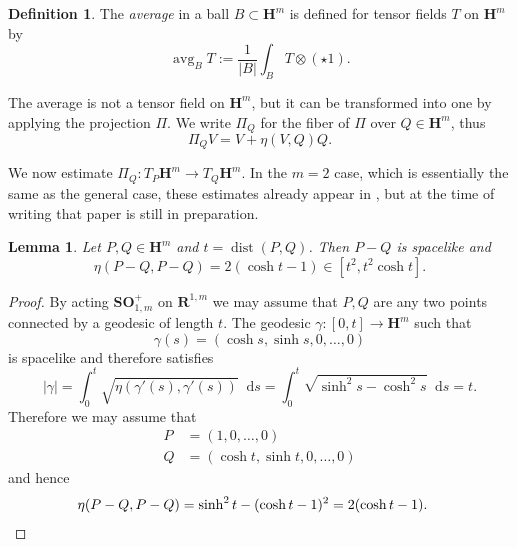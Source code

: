 \documentclass[reqno,12pt,letterpaper]{amsart}
\newcommand{\RR}{\mathbf{R}}
\newcommand{\Hyp}{\mathbf H}
\newcommand{\SpOrth}{\mathbf{SO}}
\DeclareMathOperator{\avg}{avg}
\newcommand*\dif{\mathop{}\!\mathrm{d}}
\DeclareMathOperator{\dist}{dist}
\newcommand{\dfn}[1]{\emph{#1}\index{#1}}
\newtheorem{lemma}[theorem]{Lemma}
\theoremstyle{definition}
\newtheorem{definition}[theorem]{Definition}
\numberwithin{equation}{section}
\begin{document}
\begin{definition}
The \dfn{average} in a ball $B \subset \Hyp^m$ is defined for tensor fields $T$ on $\Hyp^m$ by
$$\avg_B T := \frac{1}{|B|} \int_B T \otimes (\star 1).$$
\end{definition}

The average is not a tensor field on $\Hyp^m$, but it can be transformed into one by applying the projection $\Pi$.
We write $\Pi_Q$ for the fiber of $\Pi$ over $Q \in \Hyp^m$, thus
\begin{equation}\label{projection formula}
\Pi_Q V = V + \eta(V, Q)Q.
\end{equation}

We now estimate $\Pi_Q: T_P\Hyp^m \to T_Q\Hyp^m$.
In the $m = 2$ case, which is essentially the same as the general case, these estimates already appear in \cite{daskalopoulosPrep1}, but at the time of writing that paper is still in preparation.

\begin{lemma}
Let $P, Q \in \Hyp^m$ and $t = \dist(P, Q)$. Then $P - Q$ is spacelike and
$$\eta(P - Q, P - Q) = 2(\cosh t - 1) \in [t^2, t^2 \cosh t].$$
\end{lemma}
\begin{proof}
By acting $\SpOrth^+_{1, m}$ on $\RR^{1, m}$ we may assume that $P, Q$ are any two points connected by a geodesic of length $t$.
The geodesic $\gamma: [0, t] \to \Hyp^m$ such that
$$\gamma(s) = (\cosh s, \sinh s, 0, \dots, 0)$$
is spacelike and therefore satisfies
$$|\gamma| = \int_0^t \sqrt{\eta(\gamma'(s), \gamma'(s))} \dif s = \int_0^t \sqrt{\sinh^2 s - \cosh^2 s} \dif s = t.$$
Therefore we may assume that
\begin{align*}
P &= (1, 0, \dots, 0) \\
Q &= (\cosh t, \sinh t, 0, \dots, 0)
\end{align*}
and hence
\begin{align*}
\eta(P - Q, P - Q) &= \sinh^2 t - (\cosh t - 1)^2 = 2(\cosh t - 1). \qedhere
\end{align*}
\end{proof}
\end{document}
